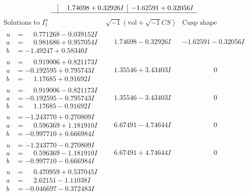 \documentclass[1p]{elsarticle_modified}
\theoremstyle{definition}
\newcommand{\I}{\sqrt{-1}}
\begin{document}
$$\begin{array}{c|c|c}
 & \phantom{-}1.74698 + 0.32926 I & -1.62591 + 0.32056 I\\
 \hline 
 \end{array}$$\newpage$$\begin{array}{c|c|c}  
\text{Solutions to }I^u_{1}& \I (\text{vol} + \sqrt{-1}CS) & \text{Cusp shape}\\
 \hline 
\begin{aligned}
u &= \phantom{-}0.771268 - 0.039152 I \\
a &= \phantom{-}0.981686 + 0.957054 I \\
b &= -1.49247 + 0.58340 I\end{aligned}
 & \phantom{-}1.74698 - 0.32926 I & -1.62591 - 0.32056 I \\ \hline\begin{aligned}
u &= \phantom{-}0.919006 + 0.821173 I \\
a &= -0.192595 + 0.795743 I \\
b &= \phantom{-}1.17685 + 0.91692 I\end{aligned}
 & \phantom{-}1.35546 + 3.43403 I & \phantom{-0.000000 } 0 \\ \hline\begin{aligned}
u &= \phantom{-}0.919006 - 0.821173 I \\
a &= -0.192595 - 0.795743 I \\
b &= \phantom{-}1.17685 - 0.91692 I\end{aligned}
 & \phantom{-}1.35546 - 3.43403 I & \phantom{-0.000000 } 0 \\ \hline\begin{aligned}
u &= -1.243770 + 0.270809 I \\
a &= \phantom{-}0.596369 + 1.181910 I \\
b &= -0.997710 + 0.666984 I\end{aligned}
 & \phantom{-}6.67491 - 4.74644 I & \phantom{-0.000000 } 0 \\ \hline\begin{aligned}
u &= -1.243770 - 0.270809 I \\
a &= \phantom{-}0.596369 - 1.181910 I \\
b &= -0.997710 - 0.666984 I\end{aligned}
 & \phantom{-}6.67491 + 4.74644 I & \phantom{-0.000000 } 0 \\ \hline\begin{aligned}
u &= \phantom{-}0.470959 + 0.537045 I \\
a &= \phantom{-}2.62151 - 1.11038 I \\
b &= -0.046697 - 0.372483 I\end{aligned}

\end{array}$$
\end{document}

